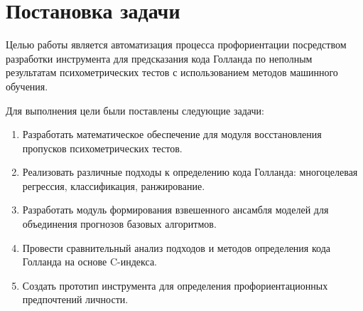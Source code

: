 
\section{Постановка задачи}
\label{sec:task}

Целью работы является автоматизация процесса профориентации посредством разработки инструмента для предсказания кода Голланда по неполным результатам психометрических тестов с использованием методов машинного обучения.

\bigbreak
Для выполнения цели были поставлены следующие задачи:
\begin{enumerate}
    \item Разработать математическое обеспечение для модуля восстановления пропусков психометрических тестов.
    \item Реализовать различные подходы к определению кода Голланда: многоцелевая регрессия, классификация, ранжирование.
    \item Разработать модуль формирования взвешенного ансамбля моделей для объединения прогнозов базовых алгоритмов.
    \item Провести сравнительный анализ подходов и методов определения кода Голланда на основе C-индекса.
    \item Создать прототип инструмента для определения профориентационных предпочтений личности.
\end{enumerate}
